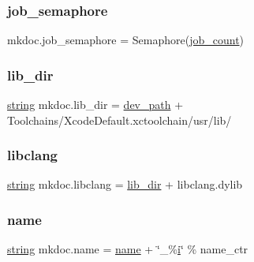\mbox{\label{namespacemkdoc_a2293819b2cd2fceaf9736ba54d68c05a}} 
\subsubsection{\texorpdfstring{job\_semaphore}{job\_semaphore}}
{\footnotesize\ttfamily mkdoc.\+job\+\_\+semaphore = Semaphore(\mbox{\hyperlink{namespacemkdoc_a78cb707792ea1729ef7e8d3887275e66}{job\+\_\+count}})}

\mbox{\label{namespacemkdoc_a79687e87b072bd21df37d124afa374ef}} 
\subsubsection{\texorpdfstring{lib\_dir}{lib\_dir}}
{\footnotesize\ttfamily \mbox{\hyperlink{asdl_8h_ae84541b4f3d8e1ea24ec0f466a8c568b}{string}} mkdoc.\+lib\+\_\+dir = \mbox{\hyperlink{namespacemkdoc_afd27915357cd6df92f7e64673bd208b5}{dev\+\_\+path}} + \textquotesingle{}Toolchains/Xcode\+Default.\+xctoolchain/usr/lib/\textquotesingle{}}

\mbox{\label{namespacemkdoc_adac3931090ead65140d186397cf36a55}} 
\subsubsection{\texorpdfstring{libclang}{libclang}}
{\footnotesize\ttfamily \mbox{\hyperlink{asdl_8h_ae84541b4f3d8e1ea24ec0f466a8c568b}{string}} mkdoc.\+libclang = \mbox{\hyperlink{namespacemkdoc_a79687e87b072bd21df37d124afa374ef}{lib\+\_\+dir}} + \textquotesingle{}libclang.\+dylib\textquotesingle{}}

\mbox{\label{namespacemkdoc_a1f8f832af63724a053f825faeeff418b}} 
\subsubsection{\texorpdfstring{name}{name}}
{\footnotesize\ttfamily \mbox{\hyperlink{asdl_8h_ae84541b4f3d8e1ea24ec0f466a8c568b}{string}} mkdoc.\+name = \mbox{\hyperlink{structname}{name}} + \char`\"{}\+\_\+\%\mbox{\hyperlink{abstract_8h_a13235ab5ddf5c2ccd5ca35ab01d91328}{i}}\char`\"{} \% name\+\_\+ctr}

